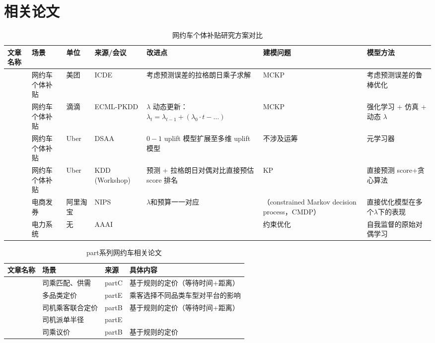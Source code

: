 \documentclass[12pt, a4paper]{article}
\begin{document}
\section{相关论文}
\begin{table}[htbp]
\centering
\scriptsize
\caption{网约车个体补贴研究方案对比}
\begin{tabular}{|p{1.2cm}|p{2.0cm}|p{1cm}|p{1.8cm}|p{3.2cm}|p{1.5cm}|p{2.5cm}|}

\hline
\textbf{文章名称} & \textbf{场景} & \textbf{单位} & \textbf{来源/会议} & \textbf{改进点} & \textbf{建模问题} & \textbf{模型方法} \\ \hline
\cite{chen2023two} & 网约车个体补贴 & 美团 & ICDE & 考虑预测误差的拉格朗日乘子求解 & MCKP & 考虑预测误差的鲁棒优化 \\ \hline
\cite{shi2025order} & 网约车个体补贴 & 滴滴 & ECML-PKDD & $\lambda$ 动态更新：$\lambda_t = \lambda_{t-1} + (\lambda_0 \cdot t - \dots)$ & MCKP & 强化学习 + 仿真 + 动态 $\lambda$ \\ \hline
\cite{zhao2019uplift} & 网约车个体补贴 & Uber & DSAA & $0-1$ uplift 模型扩展至多维 uplift 模型 & 不涉及运筹 & 元学习器 \\ \hline
\cite{du2019improve} & 网约车个体补贴 & Uber & KDD (Workshop) & 预测 + 拉格朗日对偶对比直接预估 score 排名 & KP & 直接预测 score+贪心算法 \\ \hline
\cite{zhang2021bcorle}&电商发券&阿里淘宝
&NIPS&
$\lambda$和预算一一对应&（constrained Markov decision process，CMDP）&直接优化模型在多个$\lambda$下的表现\\ \hline
\cite{park2023self}
&电力系统&无&AAAI
&&约束优化&自我监督的原始对偶学习\\ \hline
\end{tabular}
\end{table}
\begin{table}[htbp]
\centering
\scriptsize
\caption{part系列网约车相关论文}
\begin{tabular}{|p{1.2cm}|p{2.0cm}|p{1cm}|p{5cm}|}

\hline
\textbf{文章名称} & \textbf{场景} & \textbf{来源} & \textbf{具体内容}  \\ \hline
\cite{chen2021spatial} & 司乘匹配、供需 & partC   & 基于规则的定价（等待时间+距离） \\ \hline
\cite{zhan2022dynamic} & 多品类定价  &  partE &乘客选择不同品类车型对平台的影响  \\ \hline
\cite{nourinejad2020ride} &  司机乘客联合定价&  partB &基于规则的定价（等待时间+距离） \\ \hline
\cite{chen2025dynamic} & 司机派单半径 & partE & \\ \hline
\cite{chen2020dynamic}&司乘议价&partB&基于规则的定价\\\hline
\end{tabular}
\end{table}
\end{document}
